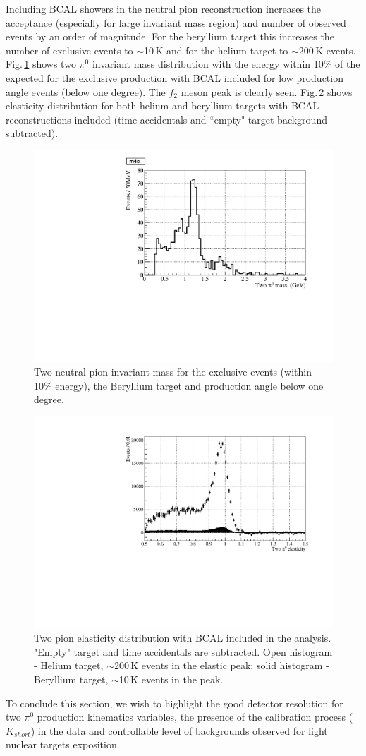 Including BCAL showers in the neutral pion reconstruction increases
the acceptance (especially for large invariant mass region) and number
of observed events by an order of magnitude. For the beryllium target
this increases the number of exclusive events to $\sim$10$\,$K and for
the helium target to $\sim$200$\,$K events. Fig.$\,$\ref{fig:bemass}
shows two $\pi^0$ invariant mass distribution with the energy within
10$\%$ of the expected for the exclusive production with BCAL included
for low production angle events (below one degree). The $f_2$ meson
peak is clearly seen. Fig.$\,$\ref{fig:beheelast} shows elasticity
distribution for both helium and beryllium targets with BCAL
reconstructions included (time accidentals and ``empty" target
background subtracted).
\begin{figure}[!h]
\centering\includegraphics[width=4.75in]{figures/be_mass.pdf}
\caption{Two neutral pion invariant mass for the exclusive events (within 10\% energy), the Beryllium target and production angle below one degree.
\label{fig:bemass}}
\end{figure}
\begin{figure}[!h]
\centering\includegraphics[width=4.5in]{figures/hebe_elast.pdf}
\caption{Two pion elasticity distribution with BCAL included in the analysis. "Empty" target and time accidentals are subtracted. Open histogram - Helium target, $\sim$200$\,$K events in the elastic peak; solid histogram - Beryllium target, $\sim$10$\,$K events in the peak.
\label{fig:beheelast}}
\end{figure}


To conclude this section, we wish to highlight the good detector
resolution for two $\pi^0$ production kinematics variables, the
presence of the calibration process ($K_{short}$) in the data and
controllable level of backgrounds observed for light nuclear targets
exposition.
